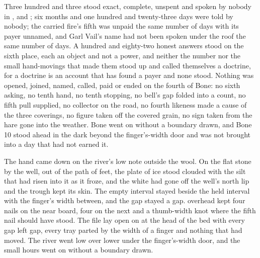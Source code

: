 Three hundred and three stood exact, complete, unspent and spoken by nobody in ,  and ; six months and one hundred and twenty-three days were told by nobody; the carried fire's fifth was unpaid the same number of days with its payer unnamed, and Garl Vail's name had not been spoken under the roof the same number of days. A hundred and eighty-two honest answers stood on the sixth place, each an object and not a power, and neither the number nor the small hand-movings that made them stood up and called themselves a doctrine, for a doctrine is an account that has found a payer and none stood. Nothing was opened, joined, named, called, paid or ended on the fourth of Bone: no sixth asking, no tenth hand, no tenth stopping, no bell's gap folded into a count, no fifth pull supplied, no collector on the road, no fourth likeness made a cause of the three coverings, no figure taken off the covered grain, no sign taken from the hare gone into the weather. Bone went on without a boundary drawn, and Bone 10 stood ahead in the dark beyond the finger's-width door and was not brought into a day that had not earned it.

The hand came down on the river's low note outside the wool. On the flat stone by the well, out of the path of feet, the plate of ice stood clouded with the silt that had risen into it as it froze, and the white had gone off the well's north lip and the trough kept its skin. The empty interval stayed beside the held interval with the finger's width between, and the gap stayed a gap.  overhead kept four nails on the near board, four on the next and a thumb-width knot where the fifth nail should have stood. The file lay open on  at the head of the bed with every gap left gap, every tray parted by the width of a finger and nothing that had moved. The river went low over lower under the finger's-width door, and the small hours went on without a boundary drawn.
